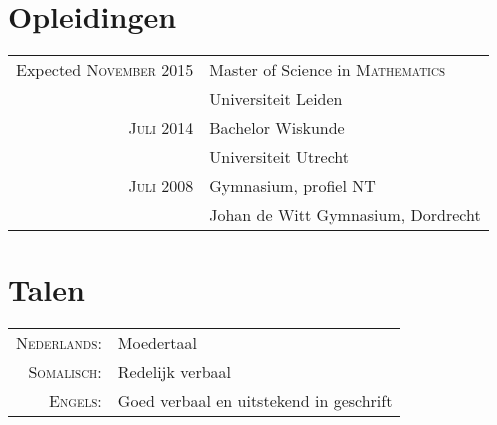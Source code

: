 \documentclass[a4paper,10pt]{article}
\begin{document}
\section{Opleidingen}
\begin{tabular}{rl}	
Expected \textsc{November} 2015 & Master of Science in \textsc{Mathematics}\\
& Universiteit Leiden\\
\textsc{Juli} 2014& Bachelor Wiskunde \\
& Universiteit Utrecht \\
\textsc{Juli} 2008 & Gymnasium, profiel NT\\
& Johan de Witt Gymnasium, Dordrecht\\
\end{tabular}

\section{Talen}
\begin{tabular}{rl}
 \textsc{Nederlands:}& Moedertaal\\
\textsc{Somalisch:}& Redelijk verbaal\\
\textsc{Engels:}& Goed verbaal en uitstekend in geschrift\\
\end{tabular}
\end{document}
